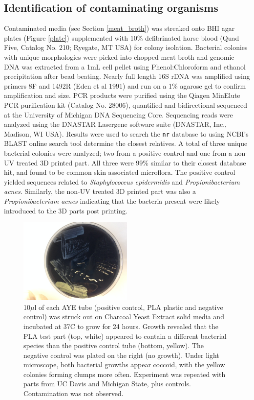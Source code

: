\begin{refsection}
\subsection{Identification of contaminating organisms}
\label{contamination_id}

Contaminated media (see Section \ref{meat_broth}) was streaked onto
BHI agar plates (Figure \ref{plate}) supplemented with 10\%
defibrinated horse blood (Quad Five, Catalog No. 210; Ryegate, MT USA)
for colony isolation. Bacterial colonies with unique morphologies were
picked into chopped meat broth and genomic DNA was extracted from a
1mL cell pellet using Phenol:Chloroform and ethanol precipitation
after bead beating. Nearly full length 16S rDNA was amplified using
primers 8F and 1492R (Eden et al 1991) and run on a 1\% agarose gel to
confirm amplification and size. PCR products were purified using the
Qiagen MinElute PCR purification kit (Catalog No. 28006), quantified
and bidirectional sequenced at the University of Michigan DNA
Sequencing Core.  Sequencing reads were analyzed using the DNASTAR
Lasergene software suite (DNASTAR, Inc., Madison, WI USA). Results
were used to search the \texttt{nr} database \cite{nr} to using NCBI's
BLAST online search tool determine the closest relatives. A total of
three unique bacterial colonies were analyzed; two from a positive
control and one from a non-UV treated 3D printed part. All three were
99\% similar to their closest database hit, and found to be common
skin associated microflora. The positive control yielded sequences
related to {\em Staphylococcus epidermidis} and {\em Propionibacterium
  acnes}. Similarly, the non-UV treated 3D printed part was also a
{\em Propionibacterium acnes} indicating that the bacteria present
were likely introduced to the 3D parts post printing.

\begin{figure}
  \centering
    \includegraphics[width=0.5\textwidth]{sterility/figures/Fig9}
 
    \caption{10$\mu$l of each AYE tube (positive control, PLA plastic
      and negative control) was struck out on Charcoal Yeast Extract
      solid media and incubated at 37C to grow for 24 hours. Growth
      revealed that the PLA test part (top, white) appeared to contain
      a different bacterial species than the positive control tube
      (bottom, yellow). The negative control was plated on the right
      (no growth). Under light microscope, both bacterial growths
      appear coccoid, with the yellow colonies forming clumps more
      often. Experiment was repeated with parts from UC Davis and
      Michigan State, plus controls. Contamination was not observed.}
 

\end{figure}
\end{refsection}

